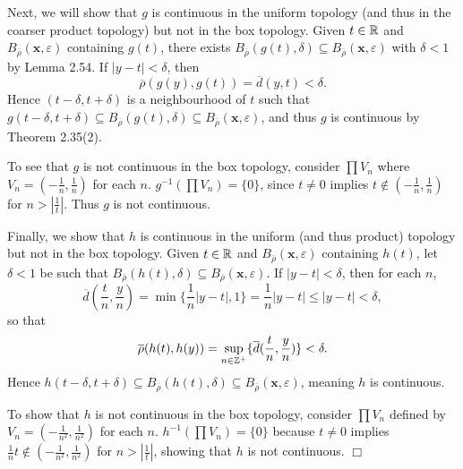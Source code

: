 \documentclass{article}
\begin{document}
\begin{enumerate}
\begin{enumerate}
        Next, we will show that $g$ is continuous in the uniform topology (and thus in the coarser product topology) but not in the box topology. Given $t \in \mathbb{R}$ and $B_{\overline{\rho}}(\mathbf{x}, \varepsilon)$ containing $g(t)$, there exists $B_{\overline{\rho}}(g(t), \delta) \subseteq B_{\overline{\rho}}(\mathbf{x}, \varepsilon)$ with $\delta < 1$ by Lemma 2.54. If $|y - t| < \delta$, then
        $$\overline{\rho}(g(y), g(t)) = \overline{d}(y, t) < \delta.$$
        Hence $(t - \delta, t + \delta)$ is a neighbourhood of $t$ such that $g(t - \delta, t + \delta) \subseteq B_{\overline{\rho}}(g(t), \delta) \subseteq B_{\overline{\rho}}(\mathbf{x}, \varepsilon)$, and thus $g$ is continuous by Theorem 2.35(2).

        To see that $g$ is not continuous in the box topology, consider $\prod V_n$ where $V_n = (-\frac1n, \frac1n)$ for each $n$. $g^{-1}(\prod V_n) = \{0\}$, since $t \neq 0$ implies $t \notin (-\frac1n, \frac1n)$ for $n > |\frac1t|$. Thus $g$ is not continuous.

        Finally, we show that $h$ is continuous in the uniform (and thus product) topology but not in the box topology. Given $t \in \mathbb{R}$ and $B_{\overline{\rho}}(\mathbf{x}, \varepsilon)$ containing $h(t)$, let $\delta < 1$ be such that $B_{\overline{\rho}}(h(t), \delta) \subseteq B_{\overline{\rho}}(\mathbf{x}, \varepsilon)$. If $|y - t| < \delta$, then for each $n$,
        $$\overline{d}(\frac{t}{n}, \frac{y}{n}) = \min \{\frac1n|y-t|, 1\} = \frac1n|y-t| \leq |y- t| < \delta,$$
        so that
        $$\overline{\rho}(h(t), h(y)) = \sup_{n \in \mathbb{Z}^+} \{ \overline{d}(\frac{t}{n}, \frac{y}{n}) \} < \delta.$$
        Hence $h(t - \delta, t + \delta) \subseteq B_{\overline{\rho}}(h(t), \delta) \subseteq B_{\overline{\rho}}(\mathbf{x}, \varepsilon)$, meaning $h$ is continuous.
        
        To show that $h$ is not continuous in the box topology, consider $\prod V_n$ defined by $V_n = (-\frac{1}{n^2}, \frac{1}{n^2})$ for each $n$. $h^{-1}(\prod V_n) = \{0\}$ because $t \neq 0$ implies $\frac1n t \notin (-\frac{1}{n^2}, \frac{1}{n^2})$ for $n > |\frac1t|$, showing that $h$ is not continuous. $\Box$


\end{enumerate}
\end{enumerate}
\end{document}
